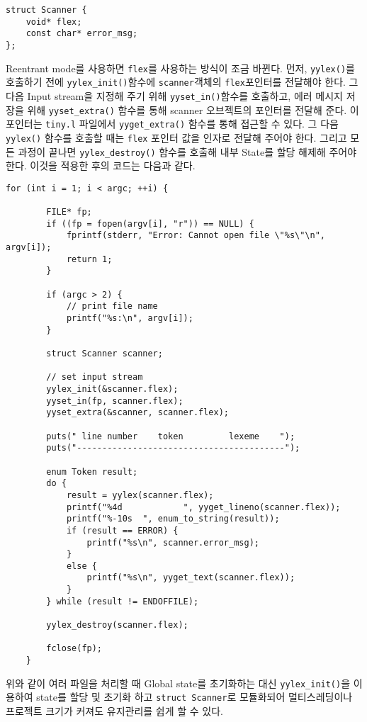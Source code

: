 \documentclass[a4paper, 10pt]{oblivoir}
\begin{document}
\begin{lstlisting}
struct Scanner {
    void* flex;
    const char* error_msg;
};
\end{lstlisting}

Reentrant mode를 사용하면 \texttt{flex}를 사용하는 방식이 조금 바뀐다. 먼저, \texttt{yylex()}를 호출하기 전에 \texttt{yylex\_init()}함수에 \texttt{scanner}객체의 \texttt{flex}포인터를 전달해야 한다. 그 다음 Input stream을 지정해 주기 위해 \texttt{yyset\_in()}함수를 호출하고, 에러 메시지 저장을 위해 \texttt{yyset\_extra()} 함수를 통해 scanner 오브젝트의 포인터를 전달해 준다. 이 포인터는 \texttt{tiny.l} 파일에서 \texttt{yyget\_extra()} 함수를 통해 접근할 수 있다. 그 다음 \texttt{yylex()} 함수를 호출할 때는 \texttt{flex} 포인터 값을 인자로 전달해 주어야 한다. 그리고 모든 과정이 끝나면 \texttt{yylex\_destroy()} 함수를 호출해 내부 State를 할당 해제해 주어야 한다. 이것을 적용한 후의 코드는 다음과 같다.

\begin{lstlisting}[caption=Segment of main.c, frame=single]
    for (int i = 1; i < argc; ++i) {

        FILE* fp;
        if ((fp = fopen(argv[i], "r")) == NULL) {
            fprintf(stderr, "Error: Cannot open file \"%s\"\n", argv[i]);
            return 1;
        }

        if (argc > 2) {
            // print file name
            printf("%s:\n", argv[i]);
        }

        struct Scanner scanner;

        // set input stream
        yylex_init(&scanner.flex);
        yyset_in(fp, scanner.flex);
        yyset_extra(&scanner, scanner.flex);

        puts(" line number    token         lexeme    ");
        puts("-----------------------------------------");

        enum Token result;
        do {
            result = yylex(scanner.flex);
            printf("%4d            ", yyget_lineno(scanner.flex));
            printf("%-10s  ", enum_to_string(result));
            if (result == ERROR) {
                printf("%s\n", scanner.error_msg);
            }
            else {
                printf("%s\n", yyget_text(scanner.flex));
            }
        } while (result != ENDOFFILE);

        yylex_destroy(scanner.flex);

        fclose(fp);
    }
\end{lstlisting}

위와 같이 여러 파일을 처리할 때 Global state를 초기화하는 대신 \texttt{yylex\_init()}을 이용하여 state를 할당 및 초기화 하고 \texttt{struct Scanner}로 모듈화되어 멀티스레딩이나 프로젝트 크기가 커져도 유지관리를 쉽게 할 수 있다.
\end{document}

